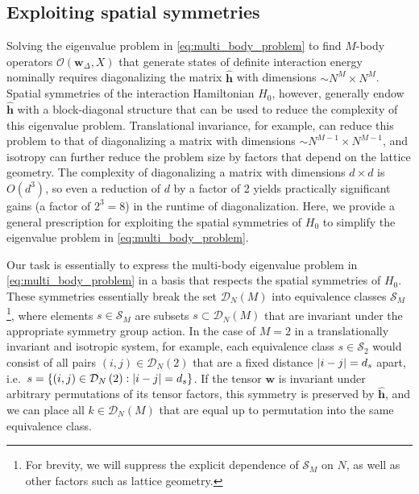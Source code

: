 \documentclass[nofootinbib,notitlepage,11pt]{revtex4-2}
\newcommand{\p}[1]{\left(#1\right)} %
\renewcommand{\set}[1]{\left\{#1\right\}} %
\newcommand{\m}{\bm} %
\newcommand{\1}{\mathds{1}}
\newcommand{\D}{\mathcal{D}}
\renewcommand{\O}{\mathcal{O}}
\renewcommand{\S}{\mathcal{S}}
\begin{document}
\subsection{Exploiting spatial symmetries}
\label{sec:symmetries}

Solving the eigenvalue problem in \eqref{eq:multi_body_problem} to
find $M$-body operators $\O\p{\m w_\Delta,X}$ that generate states of
definite interaction energy nominally requires diagonalizing the
matrix $\hat{\m h}$ with dimensions $\sim N^M\times N^M$.  Spatial
symmetries of the interaction Hamiltonian $H_0$, however, generally
endow $\hat{\m h}$ with a block-diagonal structure that can be used to
reduce the complexity of this eigenvalue problem.  Translational
invariance, for example, can reduce this problem to that of
diagonalizing a matrix with dimensions $\sim N^{M-1}\times N^{M-1}$,
and isotropy can further reduce the problem size by factors that
depend on the lattice geometry.  The complexity of diagonalizing a
matrix with dimensions $d\times d$ is $O\p{d^3}$, so even a reduction
of $d$ by a factor of 2 yields practically significant gains (a factor
of $2^3=8$) in the runtime of diagonalization.  Here, we provide a
general prescription for exploiting the spatial symmetries of $H_0$ to
simplify the eigenvalue problem in \eqref{eq:multi_body_problem}.

Our task is essentially to express the multi-body eigenvalue problem
in \eqref{eq:multi_body_problem} in a basis that respects the spatial
symmetries of $H_0$.  These symmetries essentially break the set
$\D_N\p{M}$ into equivalence classes $\S_M$\footnote{For brevity, we
  will suppress the explicit dependence of $\S_M$ on $N$, as well as
  other factors such as lattice geometry.}, where elements $s\in\S_M$
are subsets $s\subset\D_N\p{M}$ that are invariant under the
appropriate symmetry group action.  In the case of $M=2$ in a
translationally invariant and isotropic system, for example, each
equivalence class $s\in\S_2$ would consist of all pairs
$\p{i,j}\in\D_N\p{2}$ that are a fixed distance $\abs{i-j}=d_s$ apart,
i.e.~$s=\set{\p{i,j}\in\D_N\p{2}:\abs{i-j}=d_s}$.  If the tensor
$\m w$ is invariant under arbitrary permutations of its tensor
factors, this symmetry is preserved by $\hat{\m h}$, and we can place
all $k\in\D_N\p{M}$ that are equal up to permutation into the same
equivalence class.
\end{document}
